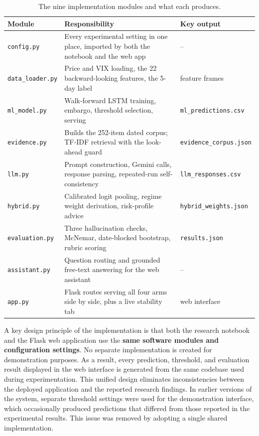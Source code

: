 \begin{table}[H]
\centering
\footnotesize
\begin{tabularx}{\textwidth}{@{}p{2.8cm}Y>{\raggedright\arraybackslash}p{3.6cm}@{}}
\toprule
\textbf{Module} & \textbf{Responsibility} & \textbf{Key output} \\
\midrule
\texttt{config.py} & Every experimental setting in one place, imported by both the notebook and the web app & -- \\
\texttt{data\_loader.py} & Price and VIX loading, the 22 backward-looking features, the 5-day label & feature frames \\
\texttt{ml\_model.py} & Walk-forward LSTM training, embargo, threshold selection, serving & \texttt{ml\_predictions.csv} \\
\texttt{evidence.py} & Builds the 252-item dated corpus; TF-IDF retrieval with the look-ahead guard & \texttt{evidence\_corpus.json} \\
\texttt{llm.py} & Prompt construction, Gemini calls, response parsing, repeated-run self-consistency & \texttt{llm\_responses.csv} \\
\texttt{hybrid.py} & Calibrated logit pooling, regime weight derivation, risk-profile advice & \texttt{hybrid\_weights.json} \\
\texttt{evaluation.py} & Three hallucination checks, McNemar, date-blocked bootstrap, rubric scoring & \texttt{results.json} \\
\texttt{assistant.py} & Question routing and grounded free-text answering for the web assistant & -- \\
\texttt{app.py} & Flask routes serving all four arms side by side, plus a live stability tab & web interface \\
\bottomrule
\end{tabularx}
\caption{The nine implementation modules and what each produces.}
\label{tab:implementation-modules}
\end{table}

A key design principle of the implementation is that both the research
notebook and the Flask web application use the \textbf{same software
modules and configuration settings}. No separate implementation is
created for demonstration purposes. As a result, every prediction,
threshold, and evaluation result displayed in the web interface is
generated from the same codebase used during experimentation. This
unified design eliminates inconsistencies between the deployed
application and the reported research findings. In earlier versions of
the system, separate threshold settings were used for the demonstration
interface, which occasionally produced predictions that differed from
those reported in the experimental results. This issue was removed by
adopting a single shared implementation.


